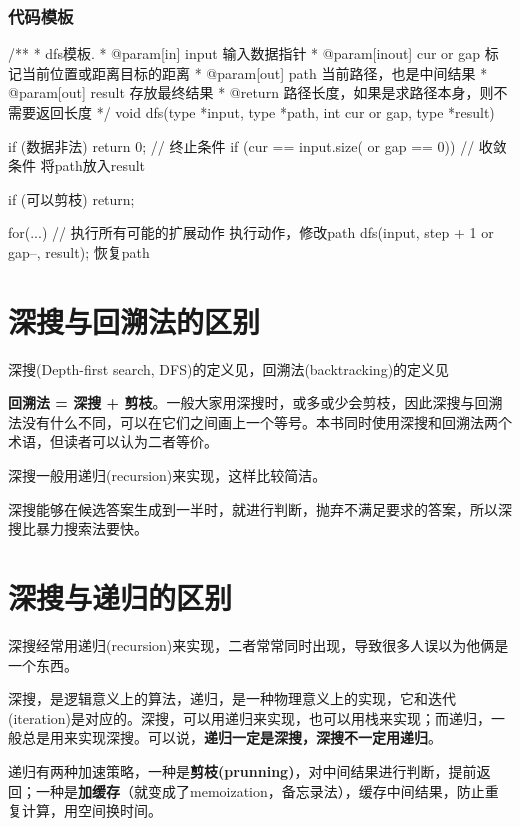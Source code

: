 \subsubsection{代码模板}
\begin{Codex}[label=dfs_template.c]
/**
 * dfs模板.
 * @param[in] input 输入数据指针
 * @param[inout] cur or gap 标记当前位置或距离目标的距离
 * @param[out] path 当前路径，也是中间结果
 * @param[out] result 存放最终结果
 * @return 路径长度，如果是求路径本身，则不需要返回长度
 */
void dfs(type *input, type *path, int cur or gap, type *result) {
    if (数据非法) return 0;   // 终止条件
    if (cur == input.size( or gap == 0)) { // 收敛条件
        将path放入result
    }

    if (可以剪枝) return;

    for(...) { // 执行所有可能的扩展动作
        执行动作，修改path
        dfs(input, step + 1 or gap--, result);
        恢复path
    }
}
\end{Codex}


\section{深搜与回溯法的区别}
深搜(Depth-first search, DFS)的定义见，回溯法(backtracking)的定义见

\textbf{回溯法 = 深搜 + 剪枝}。一般大家用深搜时，或多或少会剪枝，因此深搜与回溯法没有什么不同，可以在它们之间画上一个等号。本书同时使用深搜和回溯法两个术语，但读者可以认为二者等价。

深搜一般用递归(recursion)来实现，这样比较简洁。

深搜能够在候选答案生成到一半时，就进行判断，抛弃不满足要求的答案，所以深搜比暴力搜索法要快。

\section{深搜与递归的区别}
深搜经常用递归(recursion)来实现，二者常常同时出现，导致很多人误以为他俩是一个东西。

深搜，是逻辑意义上的算法，递归，是一种物理意义上的实现，它和迭代(iteration)是对应的。深搜，可以用递归来实现，也可以用栈来实现；而递归，一般总是用来实现深搜。可以说，\textbf{递归一定是深搜，深搜不一定用递归}。

递归有两种加速策略，一种是\textbf{剪枝(prunning)}，对中间结果进行判断，提前返回；一种是\textbf{加缓存}（就变成了memoization，备忘录法），缓存中间结果，防止重复计算，用空间换时间。


